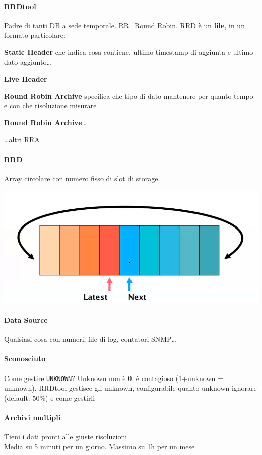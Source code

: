 \documentclass[10pt]{book}
\begin{document}
\paragraph{RRDtool} Padre di tanti DB a sede temporale. RR=Round Robin. RRD è un \textbf{file}, in un formato particolare:
\begin{list}{}{}
	\item \textbf{Static Header} che indica cosa contiene, ultimo timestamp di aggiunta e ultimo dato aggiunto\ldots
	\item \textbf{Live Header} 
	\item \textbf{Round Robin Archive} specifica che tipo di dato mantenere per quanto tempo e con che risoluzione misurare
	\item \textbf{Round Robin Archive}\ldots
	\item \ldots altri RRA
\end{list}
\paragraph{RRD} Array circolare con numero fisso di slot di storage.
\begin{center}
	\includegraphics[scale=0.7]{rrdtool_rr.png}
\end{center}
\paragraph{Data Source} Qualsiasi cosa con numeri, file di log, contatori SNMP\ldots
\paragraph{Sconosciuto} Come gestire \texttt{UNKNOWN}? Unknown non è 0, è contagioso (1+unknown = unknown). RRDtool gestisce gli unknown, configurabile quanto unknown ignorare (default: 50\%) e come gestirli
\paragraph{Archivi multipli} Tieni i dati pronti alle giuste risoluzioni\\
Media su 5 minuti per un giorno.
Massimo su 1h per un mese
\end{document}
